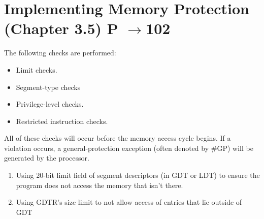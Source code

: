 \section{Implementing Memory Protection (Chapter 3.5) P $\rightarrow $102}
\begin{note}
The following checks are performed:
\begin{itemize}
\item Limit checks.
\item Segment-type checks
\item Privilege-level checks.
\item Restricted instruction checks.
\end{itemize}
All of these checks will occur before the memory access cycle begins. If a violation occurs, a general-protection exception (often denoted by \#GP) will be generated by the processor.
\end{note}

\begin{note}
\begin{enumerate}
\item Using 20-bit limit field of segment descriptors (in GDT or LDT) to ensure the program does not access the memory that isn't there.
\item Using GDTR's size limit to not allow access of entries that lie outside of GDT
\end{enumerate}
\end{note}